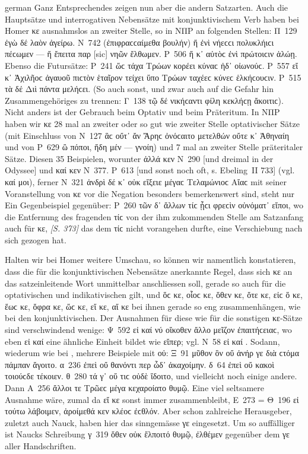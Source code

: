 \begin{otherlanguage*}{german}
Ganz Entsprechendes zeigen nun aber die andern Satzarten. Auch die Hauptsätze und interrogativen Nebensätze mit konjunktivischem Verb haben bei Homer κε ausnahmslos an zweiter Stelle, so in ΝΠΡ an folgenden Stellen: Π~129 ἐγὼ δέ  λαὸν ἀγείρω. Ν~742 (ἐπιφραϲϲαίμεθα βουλήν) ἤ  ἐνὶ νήεϲϲι πολυκλήιϲι πέϲωμεν — ἤ  ἔπειτα παρ [sic] νηῶν ἔλθωμεν. Ρ~506 ἤ κ᾽ αὐτὸϲ ἐνὶ πρώτοιϲιν ἁλώῃ. Ebenso die Futursätze: Ρ~241 ὥϲ  τάχα Τρώων κορέει κύναϲ ἠδ᾽ οἰωνούϲ. Ρ~557 εἴ κ᾽ Ἀχιλῆοϲ ἀγαυοῦ πιϲτὸν ἑταῖρον τείχει ὕπο Τρώων ταχέεϲ κύνεϲ ἑλκήϲουϲιν. Ρ~515 τὰ δέ  Διὶ πάντα μελήϲει. (So auch sonst, und zwar auch auf die Gefahr hin Zusammengehöriges zu trennen: Γ~138 τῷ δέ  νικήϲαντι φίλη κεκλήϲῃ ἄκοιτιϲ). Nicht anders ist der Gebrauch beim Optativ und beim Präteritum. In ΝΠΡ haben wir κε 28 mal an zweiter oder so gut wie zweiter Stelle optativischer Sätze (mit Einschluss von Ν~127 ἃϲ οὔτ᾽ ἄν  Ἄρηϲ ὀνόϲαιτο μετελθών οὔτε κ᾽ Ἀθηναίη und von Ρ~629 ὢ πόποι, ἤδη μέν  — γνοίη) und 7 mal an zweiter Stelle präteritaler Sätze. Diesen 35 Beispielen, worunter ἀλλά κεν Ν~290 [und dreimal in der Odyssee] und καί κεν Ν~377. Ρ~613 [und sonst noch oft, s. Ebeling~II 733] (vgl. καί μοι), ferner Ν~321 ἀνδρὶ δέ κ᾽ οὐκ εἴξειε μέγαϲ Τελαμώνιοϲ Αἴαϲ mit seiner Voranstellung von κε vor die Negation besonders bemerkenswert sind, steht nur Ein Gegenbeispiel gegenüber: Ρ~260 τῶν δ᾽ ἄλλων τίϲ  ᾗϲι φρεϲὶν οὐνόματ᾽ εἴποι, wo die Entfernung des fragenden τίϲ von der ihm zukommenden Stelle am Satzanfang auch für κε, \hypertarget{p373}{\emph{[S. 373]}}\label{p373} das dem τίϲ nicht vorangehen durfte, eine Verschiebung nach sich gezogen hat.

Halten wir bei Homer weitere Umschau, so können wir namentlich konstatieren, dass die für die konjunktivischen Nebensätze anerkannte Regel, dass sich κε an das satzeinleitende Wort unmittelbar anschliessen soll, gerade so auch für die optativischen und indikativischen gilt, und ὅϲ κε, οἷοϲ κε, ὅθεν κε, ὅτε κε, εἰϲ ὅ κε, ἕωϲ κε, ὄφρα κε, ὥϲ κε, εἴ κε, αἵ κε bei ihnen gerade so eng zusammenhängen, wie bei den konjunktivischen. Der Ausnahmen für diese wie für die sonstigen κε-Sätze sind verschwindend wenige: Ψ~592 εἰ καί νύ  οἴκοθεν ἄλλο μεῖζον ἐπαιτήϲειαϲ, wo eben εἰ καί eine ähnliche Einheit bildet wie εἴπερ; vgl. Ν~58 εἰ καί . Sodann, wiederum wie bei , mehrere Beispiele mit οὐ: Ξ~91 μῦθον ὃν οὔ  ἀνήρ γε διὰ ϲτόμα πάμπαν ἄγοιτο. α~236 ἐπεὶ οὔ  θανόντι περ ὧδ᾽ ἀκαχοίμην. δ~64 ἐπεὶ οὔ  κακοὶ τοιούϲδε τέκοιεν. θ~280 τά γ᾽ οὔ  τιϲ οὐδὲ ἴδοιτο, und vielleicht noch einige andere. Dann Α~256 ἄλλοι τε Τρῶεϲ μέγα  κεχαροίατο θυμῷ. Eine viel seltsamere Ausnahme wäre, zumal da εἴ κε sonst immer zusammenbleibt, Ε~273 = Θ~196 εἰ τούτω  λάβοιμεν, ἀροίμεθά κεν κλέοϲ ἐϲθλόν. Aber schon zahlreiche Herausgeber, zuletzt auch Nauck, haben hier das sinngemässe γε eingesetzt. Um so auffälliger ist Naucks Schreibung γ~319 ὅθεν οὐκ ἔλποιτό  θυμῷ, ἐλθέμεν gegenüber dem γε aller Handschriften.


\end{otherlanguage*}
